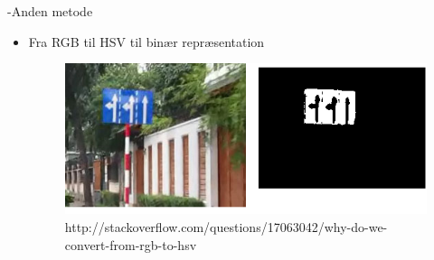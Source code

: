 \begin{frame}[fragile]{\insertsection}{\insertsubsection -Anden metode}
	\begin{itemize}
		\item Fra RGB til HSV til binær repræsentation
		\begin{figure}
			\begin{minipage}{.9\textwidth}
				\includegraphics[width=\textwidth]{pictures/rgbhsv.png}
				\caption{http://stackoverflow.com/questions/17063042/why-do-we-convert-from-rgb-to-hsv}
			\end{minipage}
		\end{figure}
	\end{itemize}
\end{frame}

